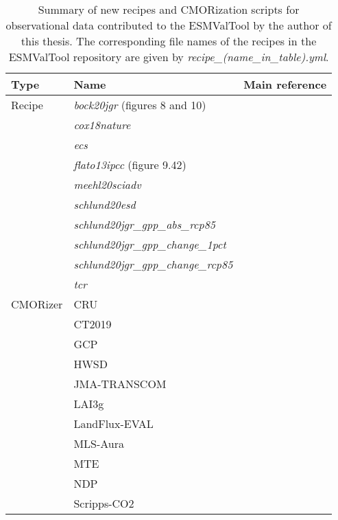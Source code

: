 \begin{table}[!b]
  \centering
  \begin{tabulary}{\columnwidth}{L L L}
    \toprule
    Type & Name & Main reference \\
    \midrule
    Recipe & \emph{bock20jgr} (figures 8 and 10) & \autocite{Bock2020} \\
    & \emph{cox18nature} & \autocite{Cox2018} \\
    & \emph{ecs} & \autocite{Gregory2004} \\
    & \emph{flato13ipcc} (figure 9.42) & \autocite{Flato2013} \\
    & \emph{meehl20sciadv} & \autocite{Meehl2020} \\
    & \emph{schlund20esd} & \autocite{Schlund2020a} \\
    & \emph{schlund20jgr\_gpp\_abs\_rcp85} & \autocite{Schlund2020} \\
    & \emph{schlund20jgr\_gpp\_change\_1pct} & \autocite{Schlund2020} \\
    & \emph{schlund20jgr\_gpp\_change\_rcp85} & \autocite{Schlund2020} \\
    & \emph{tcr} & \autocite{Gregory2008} \\
    \midrule
    \ac{CMOR}izer & CRU & \autocite{Harris2014} \\
    & CT2019 & \autocite{Jacobson2020} \\
    & GCP & \autocite{Friedlingstein2020} \\
    & HWSD & \autocite{Wieder2014} \\
    & JMA-TRANSCOM & \autocite{Maki2010} \\
    & LAI3g & \autocite{Zhu2013} \\
    & LandFlux-EVAL & \autocite{Mueller2013} \\
    & MLS-Aura & \autocite{Read2015} \\
    & MTE & \autocite{Jung2011} \\
    & NDP & \autocite{Gibbs2006} \\
    & Scripps-\ac{CO2} & \autocite{Keeling2005} \\
    \bottomrule
  \end{tabulary}
  \caption{Summary of new recipes and \acs{CMOR}ization scripts for
    observational data contributed to the \acf{ESMValTool} by the author of
    this thesis. The corresponding file names of the recipes in the
    \acs{ESMValTool} repository are given by
    \emph{recipe\_(name\_in\_table).yml}.}
  \label{tab:03:changes_to_esmvaltool}
\end{table}

